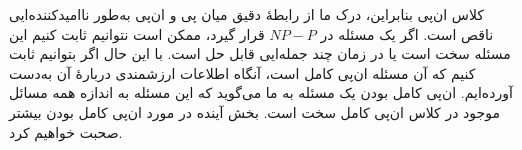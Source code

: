 \begin{itemframe}{کلاس ان‌پی}
\itm
بنابراین، درک ما از رابطهٔ دقیق میان پی و ان‌پی به‌طور ناامیدکننده‌ایی ناقص است. اگر یک مسئله در $ NP - P $ قرار گیرد، ممکن است نتوانیم ثابت کنیم این مسئله سخت است یا در زمان چند جمله‌ایی قابل حل است.
\itm
با این حال اگر بتوانیم ثابت کنیم که آن مسئله ان‌پی کامل است، آنگاه اطلاعات ارزشمندی دربارهٔ آن به‌دست آورده‌ایم. ان‌پی کامل بودن یک مسئله به ما می‌گوید که این مسئله به اندازه همه مسائل موجود در کلاس ان‌پی کامل سخت است.
\itm
بخش آینده در مورد  ان‌پی کامل بودن بیشتر صحبت خواهیم کرد.
\end{itemframe}

